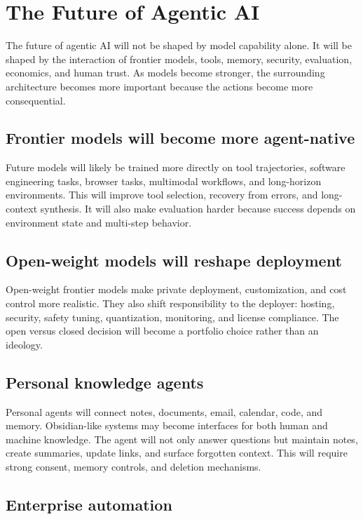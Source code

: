 \chapter{The Future of Agentic AI}

The future of agentic AI will not be shaped by model capability alone. It will be shaped by the interaction of frontier models, tools, memory, security, evaluation, economics, and human trust. As models become stronger, the surrounding architecture becomes more important because the actions become more consequential.

\section{Frontier models will become more agent-native}

Future models will likely be trained more directly on tool trajectories, software engineering tasks, browser tasks, multimodal workflows, and long-horizon environments. This will improve tool selection, recovery from errors, and long-context synthesis. It will also make evaluation harder because success depends on environment state and multi-step behavior.

\section{Open-weight models will reshape deployment}

Open-weight frontier models make private deployment, customization, and cost control more realistic. They also shift responsibility to the deployer: hosting, security, safety tuning, quantization, monitoring, and license compliance. The open versus closed decision will become a portfolio choice rather than an ideology.

\section{Personal knowledge agents}

Personal agents will connect notes, documents, email, calendar, code, and memory. Obsidian-like systems may become interfaces for both human and machine knowledge. The agent will not only answer questions but maintain notes, create summaries, update links, and surface forgotten context. This will require strong consent, memory controls, and deletion mechanisms.

\section{Enterprise automation}

